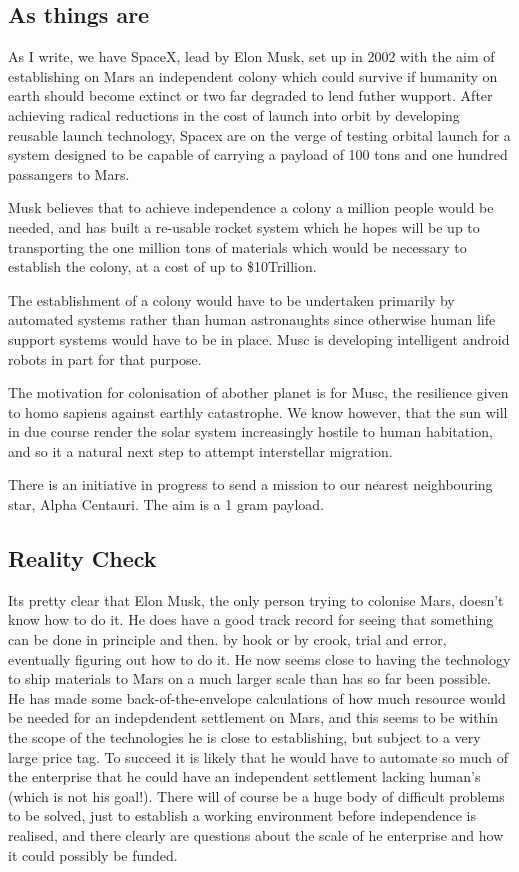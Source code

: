 \documentclass[10pt,titlepage]{article}
\begin{document}
\subsection{As things are}

As I write, we have SpaceX, lead by Elon Musk, set up in 2002 with the aim of establishing on Mars an independent colony which could survive if humanity on earth should become extinct or two far degraded to lend futher wupport.
After achieving radical reductions in the cost of launch into orbit by developing reusable launch technology, Spacex are on the verge of testing orbital launch for a system designed to be capable of carrying a payload of 100 tons and one hundred passangers to Mars.

Musk believes that to achieve independence a colony a million people would be needed, and has built a re-usable rocket system which he hopes will be up to transporting the one million tons of materials which would be necessary to establish the colony, at a cost of up to \$10Trillion.

The establishment of a colony would have to be undertaken primarily by automated systems rather than human astronaughts since otherwise human life support systems would have to be in place.
Musc is developing intelligent android robots in part for that purpose.

The motivation for colonisation of abother planet is for Musc, the resilience given to homo sapiens against earthly catastrophe.
We know however, that the sun will in due course render the solar system increasingly hostile to human habitation, and so it a natural next step to attempt interstellar migration.

There is an initiative in progress to send a mission to our nearest neighbouring star,
Alpha Centauri.
The aim is a 1 gram payload.

\subsection{Reality Check}

Its pretty clear that Elon Musk, the only person trying to colonise Mars, doesn't know how to do it.
He does have a good track record for seeing that something can be done in principle and then. by hook or by crook, trial and error, eventually figuring out how to do it.
He now seems close to having the technology to ship materials to Mars on a much larger scale than has so far been possible.
He has made some back-of-the-envelope calculations of how much resource would be needed for an indepdendent settlement on Mars, and this seems to be within the scope of the technologies he is close to establishing, but subject to a very large price tag.
To succeed it is likely that he would have to automate so much of the enterprise that he could have an independent settlement lacking human's (which is not his goal!).
There will of course be a huge body of difficult problems to be solved, just to establish a working environment before independence is realised, and there clearly are questions about the scale of he enterprise and how it could possibly be funded.
\end{document}
